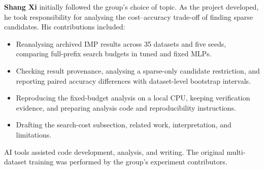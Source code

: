 \noindent\textbf{Shang Xi} initially followed the group's choice of topic. As the project developed, he took responsibility for analysing the cost--accuracy trade-off of finding sparse candidates. His contributions included:
\begin{itemize}
\item Reanalysing archived IMP results across 35 datasets and five seeds, comparing full-prefix search budgets in tuned and fixed MLPs.
\item Checking result provenance, analysing a sparse-only candidate restriction, and reporting paired accuracy differences with dataset-level bootstrap intervals.
\item Reproducing the fixed-budget analysis on a local CPU, keeping verification evidence, and preparing analysis code and reproducibility instructions.
\item Drafting the search-cost subsection, related work, interpretation, and limitations.
\end{itemize}
AI tools assisted code development, analysis, and writing. The original multi-dataset training was performed by the group's experiment contributors.
\par
